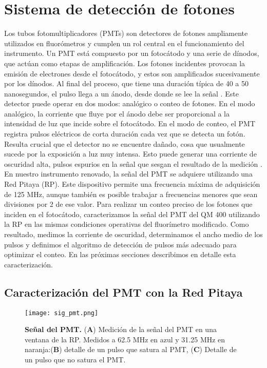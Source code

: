 \section{Sistema de detección de fotones}


 
Los tubos fotomultiplicadores (PMTs) son detectores de fotones ampliamente utilizados en fluorómetros y cumplen un rol central en el funcionamiento del instrumento. 
Un PMT está compuesto por un fotocátodo y una serie de dínodos, que actúan como etapas de amplificación. 
Los fotones incidentes provocan la emisión de electrones desde el fotocátodo, y estos son amplificados sucesivamente por los dínodos. 
Al final del proceso, que tiene una duración típica de 40 a 50 nanosegundos, el pulso llega a un ánodo, desde donde se lee la señal \cite{lakowicz_principles_2006}. 
Este detector puede operar en dos modos: analógico o conteo de fotones. 
En el modo analógico, la corriente que fluye por el ánodo debe ser proporcional a la intensidad de luz que incide sobre el fotocátodo.
En el modo de conteo, el PMT registra pulsos eléctricos de corta duración cada vez que se detecta un fotón. 
Resulta crucial que el detector no se encuentre dañado, cosa que usualmente sucede por la exposición a luz muy intensa. 
Esto puede generar una corriente de oscuridad alta, pulsos espurios en la señal que sesgan el resultado de la medición \cite{lakowicz_principles_2006}.
En nuestro instrumento renovado, la señal del PMT se adquiere utilizando una Red Pitaya (RP). 
Este dispositivo permite una frecuencia máxima de adquisición de 125 MHz, aunque también es posible trabajar a frecuencias menores que sean divisiones por 2 de ese valor. 
Para realizar un conteo preciso de los fotones que inciden en el fotocátodo, caracterizamos la señal del PMT del QM 400 utilizando la RP en las mismas condiciones operativas del fluorímetro modificado.
Como resultado, medimos la corriente de oscuridad, determinamos el ancho medio de los pulsos y definimos el algoritmo de detección de pulsos más adecuado para optimizar el conteo. 
En las próximas secciones describimos en detalle esta caracterización.



\subsection{Caracterización del PMT con la Red Pitaya} \label{sec:caracterizacion_pmt}

\begin{figure}
    \centering
    \texttt{[image: sig\_pmt.png]}
    \caption{\textbf{Señal del PMT.} (\textbf{A}) Medición de la señal del PMT en una ventana de la RP. Medidos a 62.5 MHz en azul y 31.25 MHz en naranja:(\textbf{B}) detalle de un pulso que satura al PMT, (\textbf{C}) Detalle de un pulso que no satura el PMT.}
    \label{fig:pmt_signal}
\end{figure}

